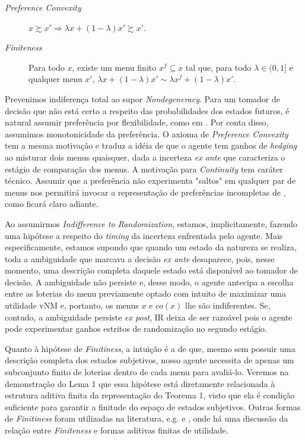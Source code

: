 \documentclass[12pt, a4paper]{article}
\theoremstyle{nonumberplain}
\theoremstyle{plain}
\theoremstyle{plain}
\theoremstyle{plain}
\theoremstyle{nonumberplain}
\begin{document}
\begin{description}
\item [\textit{Preference Convexity}] $x\succsim x' \Rightarrow \lambda x +(1-\lambda)x'\succsim x'$.
\item[\textit{Finiteness}] Para todo $x$, existe um menu finito $x^f\subseteq x$ tal que, para todo $\lambda\in (0,1]$ e qualquer menu $x'$, $\lambda x +(1-\lambda)x' \sim \lambda x^f +(1-\lambda)x'$.
\end{description}
Prevenimos indiferença total ao supor \emph{Nondegeneracy}. Para um tomador de decisão que não está certo a respeito das probabilidades dos estados futuros, é natural assumir preferência por flexibilidade, como em \cite{Kreps1979}. Por conta disso, assumimos monotonicidade da preferência. O axioma de \emph{Preference Convexity} tem a mesma motivação e traduz a idéia de que o agente tem ganhos de \emph{hedging} ao misturar dois menus quaisquer, dada a incerteza \emph{ex ante} que caracteriza o estágio de comparação dos menus. A motivação para \emph{Continuity} tem caráter técnico. Assumir que a preferência não experimenta "saltos" em qualquer par de menus nos permitirá invocar a representação de preferências incompletas de \cite{Kochov2007}, como ficará claro adiante.

Ao assumirmos \emph{Indifference to Randomization}, estamos, implicitamente, fazendo uma hipótese a respeito do \emph{timing} da incerteza enfrentada pelo agente. Mais especificamente, estamos supondo que quando um estado da natureza se realiza, toda a ambiguidade que marcava a decisão \emph{ex ante} desaparece, pois, nesse momento, uma descrição completa daquele estado está disponível ao tomador de decisão. A ambiguidade não persiste e, desse modo, o agente antecipa a escolha entre as loterias do menu previamente optado com intuito de maximizar uma utilidade vNM e, portanto, os menus $x$ e $co(x)$ lhe são indiferentes. Se, contudo, a ambiguidade persiste \emph{ex post}, IR deixa de ser razoável pois o agente pode experimentar ganhos estritos de randomização no segundo estágio.

Quanto à hipótese de \emph{Finitiness}, a intuição é a de que, mesmo sem possuir uma descrição completa dos estados subjetivos, nosso agente necessita de apenas um subconjunto finito de loterias dentro de cada menu para avaliá-lo. Veremos na demonstração do Lema 1 que essa hipótese está diretamente relacionada à estrutura aditiva finita da representação do Teorema 1, visto que ela é condição suficiente para garantir a finitude do espaço de estados subjetivos. Outras formas de \emph{Finitiness} foram utilizadas na literatura, e.g. \cite{Dekel2009} e \cite{Kopylov2009}, onde há uma discussão da relação entre \emph{Finiteness} e formas aditivas finitas de utilidade.
\end{document}
